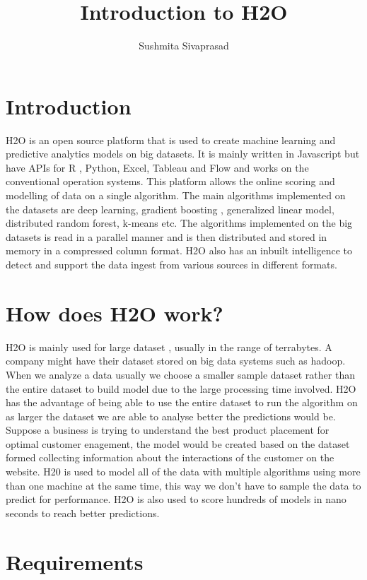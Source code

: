 \documentclass[9pt,twocolumn,twoside]{styles/osajnl}
\title{Introduction to H2O}
\author[1]{Sushmita Sivaprasad}
\affil[1]{School of Informatics and Computing, Bloomington, IN 47408, U.S.A.}
\affil[*]{ sushsiva@umail.iu.edu}
\begin{document}
\maketitle

\section{Introduction}

\cite{www-h2o-webpage}H2O is an open source platform that is used
to create machine learning and predictive analytics models on big
datasets. It is mainly written in Javascript but have APIs for R ,
Python, Excel, Tableau and Flow and works on the conventional
operation systems. This platform allows the online scoring and
modelling of data on a single algorithm. The main algorithms
implemented on the datasets are deep learning, gradient boosting ,
generalized linear model, distributed random forest, k-means
etc. The algorithms implemented on the big
datasets is read in a parallel manner and is then distributed and
stored in memory in a compressed column format. H2O also has an
inbuilt intelligence to detect and support the data ingest from
various sources in different formats.

\section{How does H2O work?}

\cite{www-h2oyoutubevideo}H2O is mainly used for large dataset ,
usually in the range of terrabytes. A company might have their dataset
stored on big data systems such as hadoop. When we analyze a data
usually we choose a smaller sample dataset rather than the entire
dataset to build model due to the large processing time involved. H2O
has the advantage of being able to use the entire dataset to run the
algorithm on as larger the dataset we are able to analyse better the
predictions would be. Suppose a business is trying to understand the
best product placement for optimal customer enagement, the model would
be created based on the dataset formed collecting information about
the interactions of the customer on the website. H20 is used to model
all of the data with multiple algorithms using more than one machine
at the same time, this way we don’t have to sample the data to predict
for performance. H2O is also used to score hundreds of models in nano
seconds to reach better predictions.

\section{Requirements}
\end{document}
